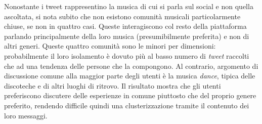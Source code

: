 \documentclass[12pt, a4paper, twocolumn]{article} %
\begin{document}
Nonostante i tweet rappresentino la musica di cui si parla sul social e non quella ascoltata, si nota subito che non esistono comunità musicali particolarmente chiuse, se non in quattro casi.
Queste interagiscono col resto della piattaforma parlando principalmente della loro musica (presumibilmente preferita) e non di altri generi.
Queste quattro comunità sono le minori per dimensioni: probabilmente il loro isolamento è dovuto più al basso numero di \textit{tweet} raccolti che ad una tendenza delle persone che la compongono.
Al contrario, argomento di discussione comune alla maggior parte degli utenti è la musica \textit{dance}, tipica delle discoteche e di altri luoghi di ritrovo.
Il risultato mostra che gli utenti preferiscono discutere delle esperienze in comune piuttosto che del proprio genere preferito, rendendo difficile quindi una clusterizzazione tramite il contenuto dei loro messaggi.


\hfill
\newpage
\printbibliography[title={Bibliografia e sitografia}]

\end{document}
